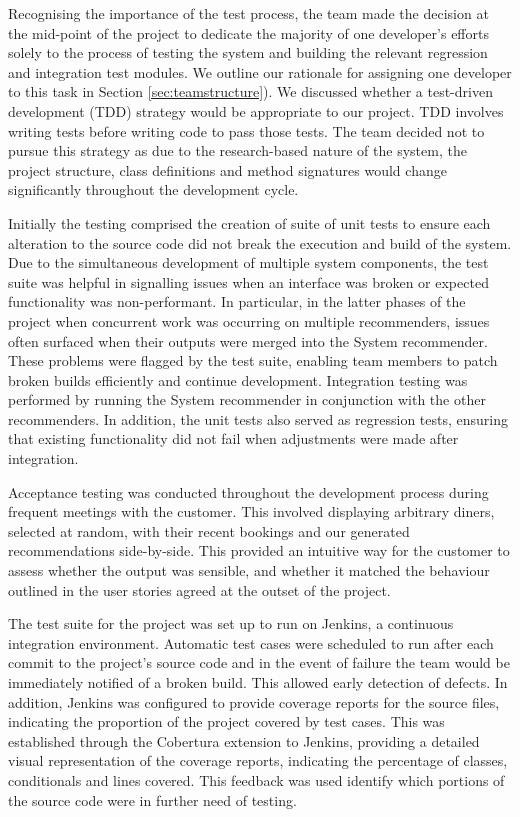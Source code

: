 \documentclass{l3proj}
\begin{document}
Recognising the importance of the test process, the team made the decision at the mid-point of the project to dedicate the majority of one developer's efforts solely to the process of testing the system and building the relevant regression and integration test modules. We outline our rationale for assigning one developer to this task in Section \ref{sec:teamstructure}). We discussed whether a test-driven development (TDD) strategy would be appropriate to our project. TDD involves writing tests before writing code to pass those tests. The team decided not to pursue this strategy as due to the research-based nature of the system, the project structure, class definitions and method signatures would change significantly throughout the development cycle. 

Initially the testing comprised the creation of suite of unit tests to ensure each alteration to the source code did not break the execution and build of the system. Due to the simultaneous development of multiple system components, the test suite was helpful in signalling issues when an interface was broken or expected functionality was non-performant. In particular, in the latter phases of the project when concurrent work was occurring on multiple recommenders, issues often surfaced when their outputs were merged into the System recommender. These problems were flagged by the test suite, enabling team members to patch broken builds efficiently and continue development. Integration testing was performed by running the System recommender in conjunction with the other recommenders. In addition, the unit tests also served as regression tests, ensuring that existing functionality did not fail when adjustments were made after integration.

Acceptance testing was conducted throughout the development process during frequent meetings with the customer. This involved displaying arbitrary diners, selected at random, with their recent bookings and our generated recommendations side-by-side. This provided an intuitive way for the customer to assess whether the output was sensible, and whether it matched the behaviour outlined in the user stories agreed at the outset of the project.

The test suite for the project was set up to run on Jenkins, a continuous integration environment. Automatic test cases were scheduled to run after each commit to the project's source code and in the event of failure the team would be immediately notified of a broken build. This allowed early detection of defects. In addition, Jenkins was configured to provide coverage reports for the source files, indicating the proportion of the project covered by test cases. This was established through the Cobertura extension to Jenkins,  providing a detailed visual representation of the coverage reports, indicating the percentage of classes, conditionals and lines covered. This feedback was used identify which portions of the source code were in further need of testing.
\end{document}
